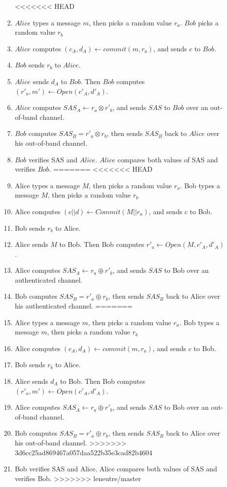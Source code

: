 \begin{enumerate}
\begin{enumerate}
\begin{enumerate}
<<<<<<< HEAD
\item $Alice$ types a message $m$, then picks a random value $r_a$. $Bob$ picks a random value $r_b$
\item $Alice$ computes $(c_A,d_A) \leftarrow commit(m,r_a)$, and sends $c$ to $Bob$.
\item $Bob$ sends $r_b$ to $Alice$.
\item $Alice$ sends $d_A$ to $Bob$. Then $Bob$ computes $(r'_a,m') \leftarrow Open(c'_A,d'_A)$. 
\item $Alice$ computes $SAS_A \leftarrow r_a \otimes r'_b$, and sends $SAS$ to $Bob$ over an out-of-band channel. 
\item $Bob$ computes $SAS_B = r'_a \otimes r_b$, then sends $SAS_B$ back to $Alice$ over his out-of-band channel. 
\item $Bob$ verifies SAS and $Alice$. $Alice$ compares both values of SAS and verifies $Bob$. 
=======
<<<<<<< HEAD
\item Alice types a message $M$, then picks a random value $r_a$. Bob types a message $M$, then picks a random value $r_b$
\item Alice computes $(c||d) \leftarrow Commit(M||r_a)$, and sends $c$ to Bob.
\item Bob sends $r_b$ to Alice.
\item Alice sends $M$ to Bob. Then Bob computes $r'_a \leftarrow Open(M,c'_A,d'_A)$. 
\item Alice computes $SAS_A \leftarrow r_a \oplus r'_b$, and sends $SAS$ to Bob over an authenticated channel. 
\item Bob computes $SAS_B = r'_a \oplus r_b$, then sends $SAS_B$ back to Alice over his authenticated channel. 
=======
\item Alice types a message $m$, then picks a random value $r_a$. Bob types a message $m$, then picks a random value $r_b$
\item Alice computes $(c_A,d_A) \leftarrow commit(m,r_a)$, and sends $c$ to Bob.
\item Bob sends $r_b$ to Alice.
\item Alice sends $d_A$ to Bob. Then Bob computes $(r'_a,m') \leftarrow Open(c'_A,d'_A)$. 
\item Alice computes $SAS_A \leftarrow r_a \oplus r'_b$, and sends $SAS$ to Bob over an out-of-band channel. 
\item Bob computes $SAS_B = r'_a \oplus r_b$, then sends $SAS_B$ back to Alice over his out-of-band channel. 
>>>>>>> 3d6cc25ad869467a057daa522b35e3cad82b4604
\item Bob verifies SAS and Alice. Alice compares both values of SAS and verifies Bob. 
>>>>>>> leneutre/master
\end{enumerate}


\end{enumerate}
\end{enumerate}
